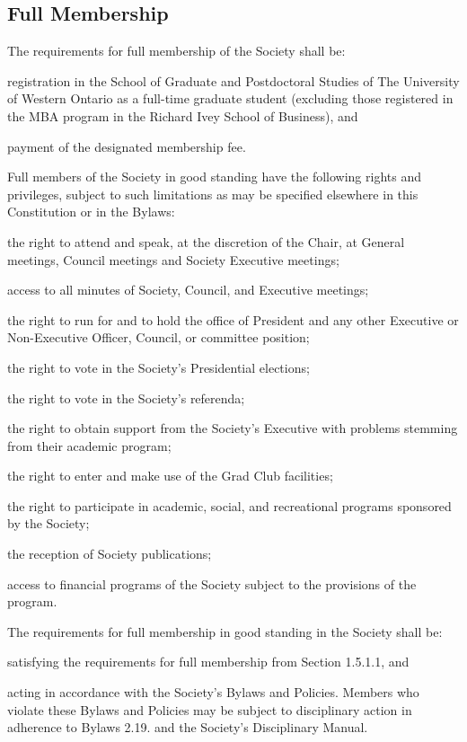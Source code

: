 \subsection{Full Membership}
	\begin{longenum}[label*=\thesubsection.\arabic*., align=left]
 \item The requirements for full membership of the Society shall be: 
     	\begin{longenum}[label*=\arabic*., align=left]
    	\item registration in the School of Graduate and Postdoctoral Studies of The University of Western Ontario as a full-time graduate student (excluding those registered in the MBA program in the Richard Ivey School of Business), and
    	\item payment of the designated membership fee.
   	\end{longenum}
 \item  Full members of the Society in good standing have the following rights and privileges, subject to such limitations as may be specified elsewhere in this Constitution or in the Bylaws:
\begin{longenum}[label*=\arabic*., align=left]
  \item the right to attend and speak, at the discretion of the Chair, at General meetings, Council meetings and Society Executive meetings;
  \item access to all minutes of Society, Council, and Executive meetings;
  \item the right to run for and to hold the office of President and any other Executive or Non-Executive Officer, Council, or committee position;
  \item the right to vote in the Society's Presidential elections;
  \item the right to vote in the Society's referenda; 
  \item the right to obtain support from the Society's Executive with problems stemming from their academic program; 
  \item the right to enter and make use of the Grad Club facilities;
  \item the right to participate in academic, social, and recreational programs sponsored by the Society; 
  \item the reception of Society publications;
   \item access to financial programs of the Society subject to the provisions of the program.
	\end{longenum}
  \item The requirements for full membership in good standing in the Society shall be: 
  	\begin{longenum}[label*=\arabic*., align=left]
  	\item satisfying the requirements for full membership from Section 1.5.1.1, and 
    \item acting in accordance with the Society’s Bylaws and Policies. Members who violate these Bylaws and Policies may be subject to disciplinary action in adherence to Bylaws 2.19. and the Society’s Disciplinary Manual.  
  	\end{longenum}
 

\end{longenum}
